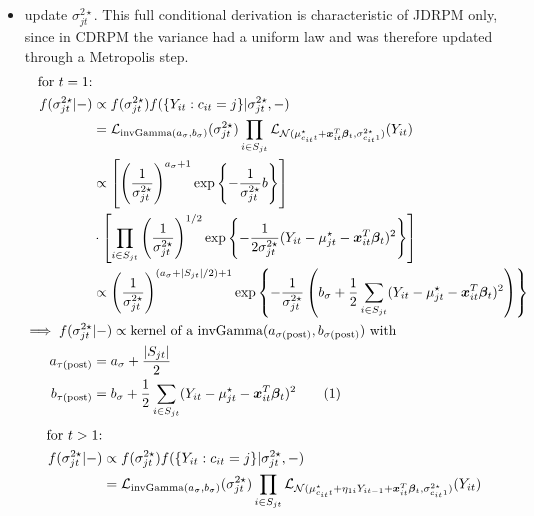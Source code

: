 \documentclass[12pt,	%
	a4paper,		%
	twoside,		%
	openright,		%
	titlepage,%
	]{book}
\theoremstyle{definition}
\begin{document}


\begin{itemize}

\item update $\sigma^{2\star}_{jt}$. This full conditional derivation is characteristic of JDRPM only, since in CDRPM the variance had a uniform law and was therefore updated through a Metropolis step. 
\begin{align*}
\text{for $t=1$:}&\\
f(\sigma^{2\star}_{jt}|-) & \propto f(\sigma^{2\star}_{jt}) f(\{Y_{it} : c_{it}=j\}|\sigma^{2\star}_{jt},-) \\
& = \law_{\invgamma(a_\sigma,b_\sigma)}(\sigma^{2\star}_{jt}) \prod_{i\in S_{jt}} \law_{\N(\mu^\star_{c_{it}t} + \vec{x}_{it}^T\vec{\beta}_t,\sigma^{2\star}_{c_{it}1})}(Y_{it})\\
& \propto \left[ \left( \frac{1}{\sigma^{2\star}_{jt}}\right)^{a_\sigma+1} \expp{-\frac{1}{\sigma^{2\star}_{jt}}b} \right] \\ & \cdot\left[  \prod_{i \in S_{jt}} 
\left( \frac{1}{\sigma^{2\star}_{jt}}\right)^{1/2} \expp{-\frac{1}{2\sigma^{2\star}_{jt}}(Y_{it}-\mu^\star_{jt}-\vec{x}_{it}^T\vec{\beta}_t)^2} \right]\\
& \propto \left( \frac{1}{\sigma^{2\star}_{jt}}\right)^{(a_\sigma + |S_{jt}|/2)+1}\expp{-\frac{1}{\sigma^{2\star}_{jt}}\left( b_\sigma + \frac{1}{2}\sum_{i \in S_{jt}}(Y_{it}-\mu^\star_{jt}-\vec{x}_{it}^T\vec{\beta}_t)^2 \right)}\\ 
%
 \implies f(\sigma^{2\star}_{jt}&|-)\propto \text{kernel of a $\invgamma(a_{\postp{\sigma}}, b_{\postp{\sigma}})$ with}\\
a_{\postp{\tau}}&= a_\sigma + \frac{|S_{jt}|}{2} \\
%
b_{\postp{\tau}}&=b_\sigma + \frac{1}{2}\sum_{i \in S_{jt}}(Y_{it}-\mu^\star_{jt}-\vec{x}_{it}^T\vec{\beta}_t)^2 
\tag{\stepcounter{equation}\theequation}
\end{align*}
\begin{align*}
\text{for $t>1$:}&\\
f(\sigma^{2\star}_{jt}|-) & \propto f(\sigma^{2\star}_{jt}) f(\{Y_{it} : c_{it}=j\}|\sigma^{2\star}_{jt},-) \\
& = \law_{\invgamma(a_\sigma,b_\sigma)}(\sigma^{2\star}_{jt}) \prod_{i\in S_{jt}} \law_{\N(\mu^\star_{c_{it}t} +\eta_{1i}Y_{it-1}+ \vec{x}_{it}^T\vec{\beta}_t,\sigma^{2\star}_{c_{it}1})}(Y_{it})\\

\end{align*}
\end{itemize}
\end{document}
